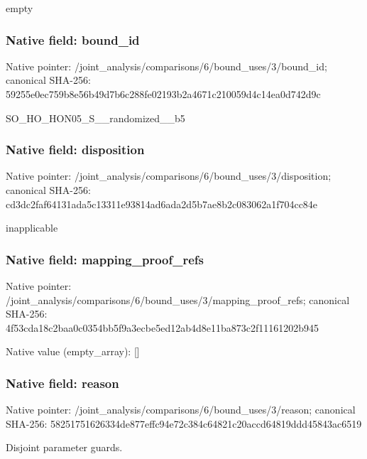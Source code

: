 \documentclass[10pt,a4paper]{article}
\begin{document}
\begingroup\raggedright\sloppy empty\par\endgroup

\subsubsection{Native field: bound\_\allowbreak{}id}
Native pointer: /joint\_\allowbreak{}analysis/comparisons/6/bound\_\allowbreak{}uses/3/bound\_\allowbreak{}id; canonical SHA-256: 59255e0ec759b8e56b49d7b6c288fe02193b2a4671c210059d4c14ea0d742d9c

\begingroup\raggedright\sloppy SO\_\allowbreak{}HO\_\allowbreak{}HON05\_\allowbreak{}S\_\allowbreak{}\_\allowbreak{}randomized\_\allowbreak{}\_\allowbreak{}b5\par\endgroup

\subsubsection{Native field: disposition}
Native pointer: /joint\_\allowbreak{}analysis/comparisons/6/bound\_\allowbreak{}uses/3/disposition; canonical SHA-256: cd3dc2faf64131ada5c13311e93814ad6ada2d5b7ae8b2c083062a1f704cc84e

\begingroup\raggedright\sloppy inapplicable\par\endgroup

\subsubsection{Native field: mapping\_\allowbreak{}proof\_\allowbreak{}refs}
Native pointer: /joint\_\allowbreak{}analysis/comparisons/6/bound\_\allowbreak{}uses/3/mapping\_\allowbreak{}proof\_\allowbreak{}refs; canonical SHA-256: 4f53cda18c2baa0c0354bb5f9a3ecbe5ed12ab4d8e11ba873c2f11161202b945

Native value (empty\_\allowbreak{}array): []

\subsubsection{Native field: reason}
Native pointer: /joint\_\allowbreak{}analysis/comparisons/6/bound\_\allowbreak{}uses/3/reason; canonical SHA-256: 58251751626334de877effc94e72c384c64821c20accd64819ddd45843ac6519

\begingroup\raggedright\sloppy Disjoint parameter guards.\par\endgroup
\end{document}
